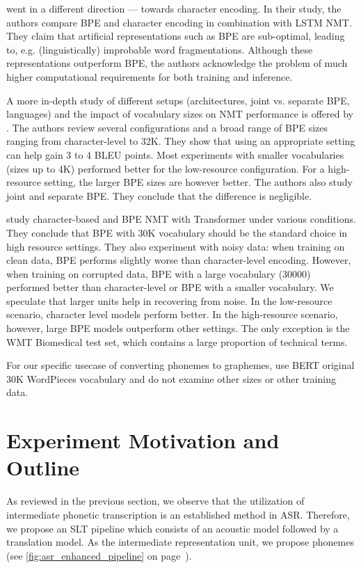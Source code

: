  went in a different direction --- towards character encoding. In their study, the authors compare BPE and character encoding in combination with LSTM NMT. They claim that artificial representations such as BPE are sub-optimal, leading to, e.g. (linguistically) improbable word fragmentations. Although these representations outperform BPE, the authors acknowledge the problem of much higher computational requirements for both training and inference.

A more in-depth study of different setups (architectures, joint vs. separate BPE, languages) and the impact of vocabulary sizes on NMT performance is offered by . The authors review several configurations and a broad range of BPE sizes ranging from character-level to 32K. They show that using an appropriate setting can help gain 3 to 4 BLEU points. Most experiments with smaller vocabularies (sizes up to 4K) performed better for the low-resource configuration. For a high-resource setting, the larger BPE sizes are however better. The authors also study joint and separate BPE. They conclude that the difference is negligible.


 study character-based and BPE NMT with Transformer under various conditions. They conclude that BPE with 30K vocabulary should be the standard choice in high resource settings. They also experiment with noisy data: when training on clean data, BPE performs slightly worse than character-level encoding. However, when training on corrupted data, BPE with a large vocabulary (30000) performed better than character-level or BPE with a smaller vocabulary. We speculate that larger units help in recovering from noise. In the low-resource scenario, character level models perform better. In the high-resource scenario, however, large BPE models outperform other settings. The only exception is the WMT Biomedical test set, which contains a large proportion of technical terms.

For our specific usecase of converting phonemes to graphemes,  use BERT  original 30K WordPieces vocabulary and do not examine other sizes or other training data.

\section{Experiment Motivation and Outline}
\label{easr:eperiment}
As reviewed in the previous section, we observe that the utilization of intermediate phonetic transcription is an established method in ASR. Therefore, we propose an SLT pipeline which consists of an acoustic model followed by a translation model. As the intermediate representation unit, we propose phonemes (see \cref{fig:asr_enhanced_pipeline} on page~\pageref{fig:asr_enhanced_pipeline}). 

